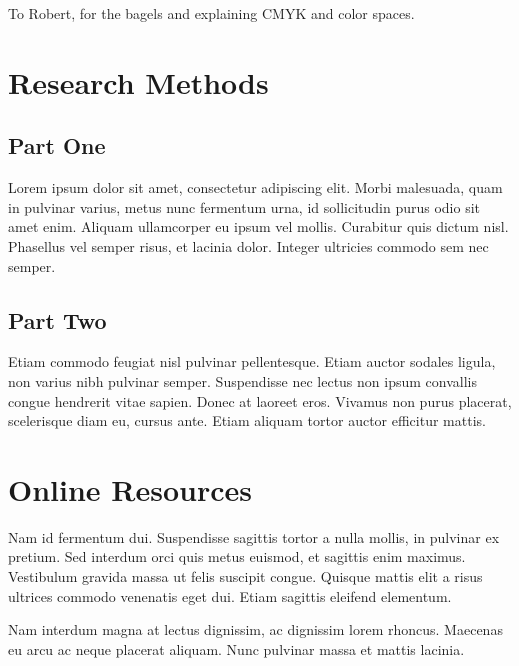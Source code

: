 \documentclass[manuscript,screen,review]{acmart}
\begin{document}









\begin{acks}
To Robert, for the bagels and explaining CMYK and color spaces.
\end{acks}




\appendix

\section{Research Methods}

\subsection{Part One}

Lorem ipsum dolor sit amet, consectetur adipiscing elit. Morbi
malesuada, quam in pulvinar varius, metus nunc fermentum urna, id
sollicitudin purus odio sit amet enim. Aliquam ullamcorper eu ipsum
vel mollis. Curabitur quis dictum nisl. Phasellus vel semper risus, et
lacinia dolor. Integer ultricies commodo sem nec semper.

\subsection{Part Two}

Etiam commodo feugiat nisl pulvinar pellentesque. Etiam auctor sodales
ligula, non varius nibh pulvinar semper. Suspendisse nec lectus non
ipsum convallis congue hendrerit vitae sapien. Donec at laoreet
eros. Vivamus non purus placerat, scelerisque diam eu, cursus
ante. Etiam aliquam tortor auctor efficitur mattis.

\section{Online Resources}

Nam id fermentum dui. Suspendisse sagittis tortor a nulla mollis, in
pulvinar ex pretium. Sed interdum orci quis metus euismod, et sagittis
enim maximus. Vestibulum gravida massa ut felis suscipit
congue. Quisque mattis elit a risus ultrices commodo venenatis eget
dui. Etiam sagittis eleifend elementum.

Nam interdum magna at lectus dignissim, ac dignissim lorem
rhoncus. Maecenas eu arcu ac neque placerat aliquam. Nunc pulvinar
massa et mattis lacinia.
\end{document}
